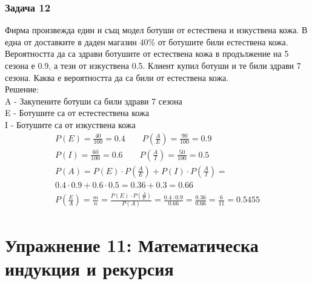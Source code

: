 \documentclass[fleqn, 12pt]{article}
\theoremstyle{definition}
\begin{document}
\subsubsection*{Задача 12}
Фирма произвежда един и същ модел ботуши от естествена и изкуствена кожа. 
В една от доставките в даден магазин 40\% от ботушите били естествена кожа.
Вероятността да са здрави ботушите от естествена кожа в продължение на 5 сезона е 0.9, а тези от изкуствена 0.5.
Клиент купил ботуши и те били здрави 7 сезона.
Каква е вероятността да са били от естествена кожа. \\
Решение: \\
A - Закупените ботуши са били здрави 7 сезона \\
E - Ботушите са от естестествена кожа \\
I - Ботушите са от изкуствена кожа\\
\begin{gather*}
P(E) = \frac{40}{100} = 0.4 \qquad P \left( \frac{A}{E} \right) = \frac{90}{100} = 0.9 \\
P(I) = \frac{60}{100} = 0.6 \qquad P \left( \frac{A}{I} \right) = \frac{50}{100} = 0.5 \\
P(A) = P(E) \cdot  P \left( \frac{A}{E} \right) + P(I) \cdot  P \left( \frac{A}{I} \right) = \\
0.4 \cdot 0.9 + 0.6 \cdot 0.5 = 0.36 +0.3 = 0.66 \\
P \left( \frac{E}{A} \right) = \frac{m}{n} = \frac{ P(E) \cdot P \left( \frac{A}{E} \right)}{P(A)} = \frac{0.4 \cdot 0.9}{0.66} = \frac{0.36}{0.66} = \frac{6}{11} = 0.5455 
\end{gather*}


\newpage
\section{ Упражнение 11: Математическа индукция и рекурсия}
\end{document}
